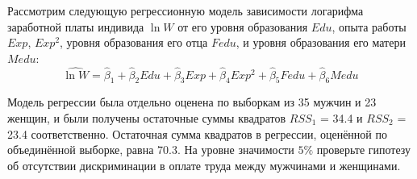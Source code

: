 \documentclass[pdftex,11pt,openany]{book}\usepackage[]{graphicx}\usepackage[]{color}
\begin{document}
\begin{problem}
 Рассмотрим следующую регрессионную модель зависимости логарифма заработной платы индивида $\ln W$ от его уровня образования $Edu$, опыта работы $Exp$, $Exp^2$, уровня образования его отца $Fedu$, и уровня образования его матери $Medu$:
\[
\widehat{\ln W}=\hat{\beta}_1+\hat{\beta}_2Edu+\hat{\beta}_3Exp+\hat{\beta}_4Exp^2+\hat{\beta}_5Fedu+\hat{\beta}_6Medu
\]

Модель регрессии была отдельно оценена по выборкам из 35 мужчин и 23 женщин, и были получены остаточные суммы квадратов $RSS_1$ = 34.4 и $RSS_2$ = 23.4 соответственно. Остаточная сумма квадратов в регрессии, оценённой по объединённой выборке, равна 70.3. На уровне значимости $5\%$ проверьте гипотезу об отсутствии дискриминации в оплате труда между мужчинами и женщинами.
\end{problem}
\end{document}
